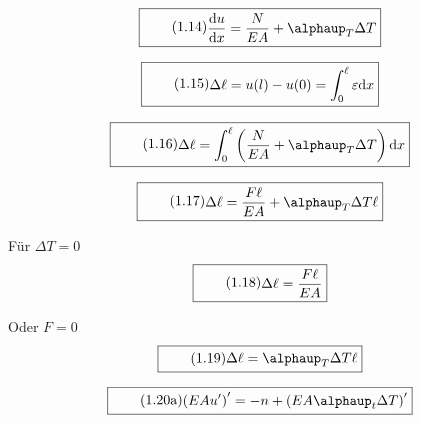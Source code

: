 \documentclass[11pt]{article}
\newcommand{\1}{ {\mathds{1}} }
\renewcommand{\alpha  }{\alphaup   }
\begin{document}
		\begin{equation}
			\boxed{
				\tag{1.14}
				\begin{split}
					\frac{\text{d}u}
							 {\text{d}x}
					=
					\frac{N}{EA}
					+
					\alpha_T \Delta T
				\end{split}
			}
		\end{equation}

		\begin{equation}
			\boxed{
				\tag{1.15}
				\begin{split}
					\Delta \ell
					=
					u(l)
					-
					u(0)
					=
					\int_{0}^{\ell}
					\varepsilon
					\text{d}x
				\end{split}
			}
		\end{equation}
		 
		\begin{equation}
			\boxed{
				\tag{1.16}
				\begin{split}
					\Delta \ell
					=
					\int_{0}^{\ell}
					\left(
						\frac{N}{EA}
						+
						\alpha_T \Delta T
					\right)
					\text{d}x
				\end{split}
			}
		\end{equation}

		\begin{equation}
			\boxed{
				\tag{1.17}
				\begin{split}
					\Delta \ell
					=
					\frac{F\ell}{EA}
					+
					\alpha_T \Delta T \ell
				\end{split}
			}
		\end{equation}


		Für $\Delta T = 0$
		\begin{equation}
			\boxed{
				\tag{1.18}
				\begin{split}
					\Delta \ell
					=
					\frac{F\ell}{EA}
				\end{split}
			}
		\end{equation}

		Oder $F = 0$
		\begin{equation}
			\boxed{
				\tag{1.19}
				\begin{split}
					\Delta \ell
					=
					\alpha_T \Delta T \ell
				\end{split}
			}
		\end{equation}
		
		\begin{equation}
			\boxed{
				\tag{1.20a}
				\begin{split}
					\left(
						EA u'
					\right)'
					=
					-n
					+
					\left(
						EA \alpha_t \Delta T
					\right)'
				\end{split}
			}
		\end{equation}
\end{document}
